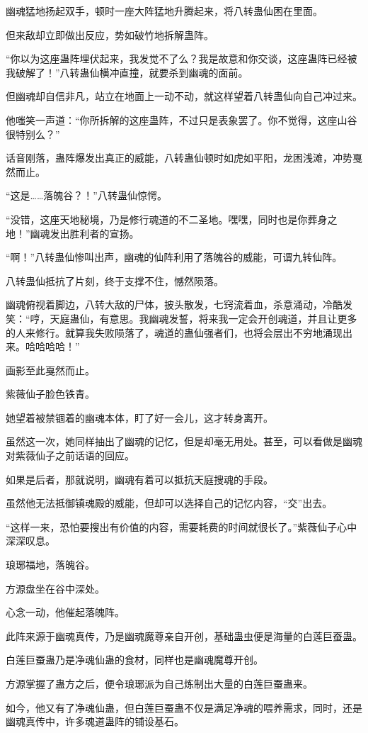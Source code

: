 \begin{this_body}
幽魂猛地扬起双手，顿时一座大阵猛地升腾起来，将八转蛊仙困在里面。

但来敌却立即做出反应，势如破竹地拆解蛊阵。

“你以为这座蛊阵埋伏起来，我发觉不了么？我是故意和你交谈，这座蛊阵已经被我破解了！”八转蛊仙横冲直撞，就要杀到幽魂的面前。

但幽魂却自信非凡，站立在地面上一动不动，就这样望着八转蛊仙向自己冲过来。

他嗤笑一声道：“你所拆解的这座蛊阵，不过只是表象罢了。你不觉得，这座山谷很特别么？”

话音刚落，蛊阵爆发出真正的威能，八转蛊仙顿时如虎如平阳，龙困浅滩，冲势戛然而止。

“这是……落魄谷？！”八转蛊仙惊愕。

“没错，这座天地秘境，乃是修行魂道的不二圣地。嘿嘿，同时也是你葬身之地！”幽魂发出胜利者的宣扬。

“啊！”八转蛊仙惨叫出声，幽魂的仙阵利用了落魄谷的威能，可谓九转仙阵。

八转蛊仙抵抗了片刻，终于支撑不住，憾然陨落。

幽魂俯视着脚边，八转大敌的尸体，披头散发，七窍流着血，杀意涌动，冷酷发笑：“哼，天庭蛊仙，有意思。我幽魂发誓，将来我一定会开创魂道，并且让更多的人来修行。就算我失败陨落了，魂道的蛊仙强者们，也将会层出不穷地涌现出来。哈哈哈哈！”

画影至此戛然而止。

紫薇仙子脸色铁青。

她望着被禁锢着的幽魂本体，盯了好一会儿，这才转身离开。

虽然这一次，她同样抽出了幽魂的记忆，但是却毫无用处。甚至，可以看做是幽魂对紫薇仙子之前话语的回应。

如果是后者，那就说明，幽魂有着可以抵抗天庭搜魂的手段。

虽然他无法抵御镇魂殿的威能，但却可以选择自己的记忆内容，“交”出去。

“这样一来，恐怕要搜出有价值的内容，需要耗费的时间就很长了。”紫薇仙子心中深深叹息。

琅琊福地，落魄谷。

方源盘坐在谷中深处。

心念一动，他催起落魄阵。

此阵来源于幽魂真传，乃是幽魂魔尊亲自开创，基础蛊虫便是海量的白莲巨蚕蛊。

白莲巨蚕蛊乃是净魂仙蛊的食材，同样也是幽魂魔尊开创。

方源掌握了蛊方之后，便令琅琊派为自己炼制出大量的白莲巨蚕蛊来。

如今，他又有了净魂仙蛊，但白莲巨蚕蛊不仅是满足净魂的喂养需求，同时，还是幽魂真传中，许多魂道蛊阵的铺设基石。


\end{this_body}
